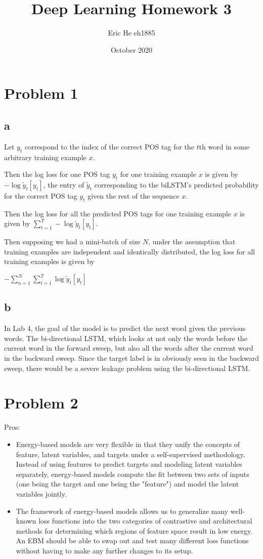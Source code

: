 \documentclass{article}
\title{Deep Learning Homework 3}
\author{Eric He eh1885 }
\date{October 2020}
\begin{document}
\maketitle

\section{Problem 1}

\subsection{a}
Let $y_t$ correspond to the index of the correct POS tag for the $t$th word in some arbitrary training example $x$.

Then the log loss for one POS tag $y_t$ for one training example $x$ is given by $-\log \tilde{y}_t[y_t]$, the entry of $\tilde{y}_t$ corresponding to the biLSTM's predicted probability for the correct POS tag $y_t$ given the rest of the sequence $x$.

Then the log loss for all the predicted POS tags for one training example $x$ is given by $\sum_{t=1}^T -\log \tilde{y}_t[y_t]$.

Then supposing we had a mini-batch of size $N$, under the assumption that training examples are independent and identically distributed, the log loss for all training examples is given by 

$-\sum_{n=1}^N \sum_{t=1}^T \log \tilde{y}_t[y_t]$

\subsection{b}
In Lab 4, the goal of the model is to predict the next word given the previous words. The bi-directional LSTM, which looks at not only the words before the current word in the forward sweep, but also all the words after the current word in the backward sweep. Since the target label is in obviously seen in the backward sweep, there would be a severe leakage problem using the bi-directional LSTM.

\section{Problem 2}
Pros:
\begin{itemize}
    \item Energy-based models are very flexible in that they unify the concepts of feature, latent variables, and targets under a self-supervised methodology. Instead of using features to predict targets and modeling latent variables separately, energy-based models compute the fit between two sets of inputs (one being the target and one being the "feature") and model the latent variables jointly.
    \item The framework of energy-based models allows us to generalize many well-known loss functions into the two categories of contrastive and architectural methods for determining which regions of feature space result in low energy. An EBM should be able to swap out and test many different loss functions without having to make any further changes to its setup.
\end{itemize}
\end{document}
